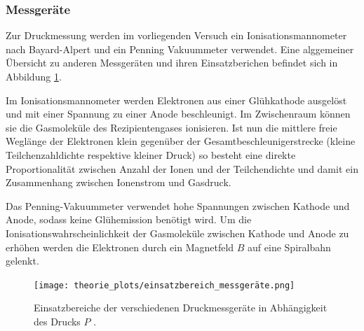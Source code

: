 \subsubsection{Messgeräte}
Zur Druckmessung werden im vorliegenden Versuch ein Ionisationsmannometer nach Bayard-Alpert und ein Penning Vakuummeter verwendet. Eine
alggemeiner Übersicht zu anderen Messgeräten und ihren Einsatzberichen befindet sich in Abbildung \ref{fig: messgeräte}.

Im Ionisationsmannometer werden Elektronen aus einer Glühkathode ausgelöst und mit einer Spannung zu einer Anode beschleunigt.
Im Zwischenraum können sie die
Gasmoleküle des Rezipientengases ionisieren. Ist nun die mittlere freie Weglänge der Elektronen klein gegenüber der
Gesamtbeschleunigerstrecke (kleine Teilchenzahldichte respektive kleiner Druck) so besteht eine direkte Proportionalität
zwischen Anzahl der Ionen und der Teilchendichte und damit ein Zusammenhang zwischen Ionenstrom und Gasdruck.

Das Penning-Vakuummeter verwendet hohe Spannungen zwischen Kathode und Anode, sodass keine Glühemission benötigt wird.
Um die Ionisationswahrscheinlichkeit der Gasmoleküle zwischen Kathode und Anode zu erhöhen werden die Elektronen
durch ein Magnetfeld $B$ auf eine Spiralbahn gelenkt.

\begin{figure}
  \centering
  \texttt{[image: theorie\_plots/einsatzbereich\_messgeräte.png]}
  \caption{Einsatzbereiche der verschiedenen Druckmessgeräte in Abhängigkeit des Drucks $P$ \cite{dem1}.}
  \label{fig: messgeräte}
\end{figure}
\FloatBarrier
